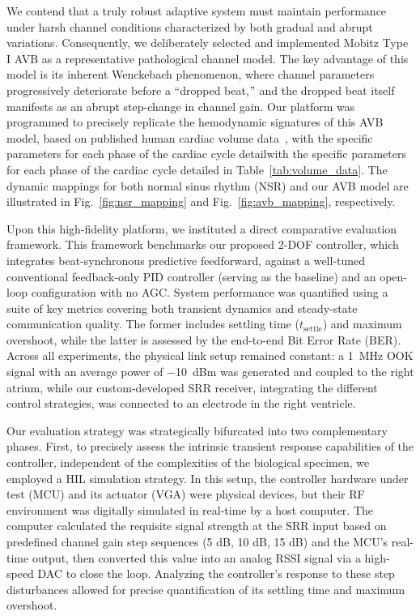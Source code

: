 \documentclass[journal]{IEEEtran}
\begin{document}
We contend that a truly robust adaptive system must maintain performance under harsh channel conditions characterized by both gradual and abrupt variations.
Consequently, we deliberately selected and implemented Mobitz Type I AVB as a representative pathological channel model.
The key advantage of this model is its inherent Wenckebach phenomenon, where channel parameters progressively deteriorate before a ``dropped beat,\("\) and the dropped beat itself manifests as an abrupt step-change in channel gain.
Our platform was programmed to precisely replicate the hemodynamic signatures of this AVB model, based on published human cardiac volume data~\cite{maceira2010reference, 2006Normalized, 2006Reference, 2013Reference, chen2022investigation}, with the specific parameters for each phase of the cardiac cycle detailwith the specific parameters for each phase of the cardiac cycle detailed in Table~\ref{tab:volume_data}.
The dynamic mappings for both normal sinus rhythm (NSR) and our AVB model are illustrated in Fig.~\ref{fig:nsr_mapping} and Fig.~\ref{fig:avb_mapping}, respectively.


Upon this high-fidelity platform, we instituted a direct comparative evaluation framework. This framework benchmarks our proposed 2-DOF controller, which integrates beat-synchronous predictive feedforward, against a well-tuned conventional feedback-only PID controller (serving as the baseline) and an open-loop configuration with no AGC. System performance was quantified using a suite of key metrics covering both transient dynamics and steady-state communication quality. The former includes settling time ($t_{\text{settle}}$) and maximum overshoot, while the latter is assessed by the end-to-end Bit Error Rate (BER). Across all experiments, the physical link setup remained constant: a \SI{1}{\mega\hertz} OOK signal with an average power of \SI{-10}{dBm} was generated and coupled to the right atrium, while our custom-developed SRR receiver, integrating the different control strategies, was connected to an electrode in the right ventricle.

Our evaluation strategy was strategically bifurcated into two complementary phases. First, to precisely assess the intrinsic transient response capabilities of the controller, independent of the complexities of the biological specimen, we employed a HIL simulation strategy. In this setup, the controller hardware under test (MCU) and its actuator (VGA) were physical devices, but their RF environment was digitally simulated in real-time by a host computer. The computer calculated the requisite signal strength at the SRR input based on predefined channel gain step sequences (5 dB, 10 dB, 15 dB) and the MCU's real-time output, then converted this value into an analog RSSI signal via a high-speed DAC to close the loop. Analyzing the controller's response to these step disturbances allowed for precise quantification of its settling time and maximum overshoot.
\end{document}
